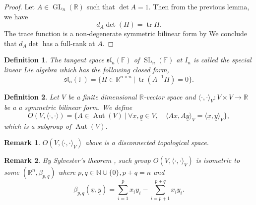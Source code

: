 \documentclass{article}
\newtheorem{definition}{Definition}[section]
\newtheorem{remark}{Remark}[section]
\numberwithin{equation}{section}
\DeclareMathOperator{\GL}{GL}
\DeclareMathOperator{\SL}{SL}
\DeclareMathOperator{\tr}{tr}
\DeclareMathOperator{\Aut}{Aut}
\begin{document}
\begin{proof}
Let $A\in\GL_n(\mathbb{R})$ such that $\det A =1$. Then from the previous lemma, we have
\begin{equation*}
d_A\det(H) = \tr H.
\end{equation*}
The trace function is a non-degenerate symmetric bilinear form by %
We conclude that $d_A\det$ has a full-rank at $A$.
\end{proof}

\begin{definition}
The tangent space $\mathfrak{sl}_n(\mathbb{F})$ of $\SL_n(\mathbb{F})$ at $I_n$ is called the special linear Lie algebra which has the following closed form,
\begin{equation*}
\mathfrak{sl}_n(\mathbb{F}) = \{H\in\mathbb{R}^{n\times n}\:|\: \tr(A^{-1}H) = 0\}.
\end{equation*}
\end{definition}

\begin{definition}
Let $V$ be a finite dimensional $\mathbb{R}$-vector space and $\langle\cdot,\cdot\rangle_V:V\times V\to\mathbb{R}$ be a a symmetric bilinear form. We define
\begin{equation*}
O(V,\langle\cdot,\cdot\rangle) = \{A\in\Aut(V)\:|\: \forall \underline{x},\underline{y}\in V,\quad \langle A\underline{x},A\underline{y}\rangle_V=\langle \underline{x},\underline{y}\rangle_V\},
\end{equation*} 
which is a subgroup of $\Aut(V)$.
\end{definition}

\begin{remark}
$O(V,\langle\cdot,\cdot\rangle_V)$ above is a disconnected topological space.
\end{remark}

\begin{remark}
By Sylvester's theorem%
, such group $O(V,\langle\cdot,\cdot\rangle_V)$ is isometric %
to some $(\mathbb{R}^n,\beta_{p,q})$ where $p,q\in\mathbb{N}\cup\{0\},p+q=n$ and 
\begin{equation*}
\beta_{p,q}(\underline{x},\underline{y}) = \sum_{i=1}^p x_iy_i-\sum_{i=p+1}^{p+q}x_iy_i.
\end{equation*}
\end{remark}
\end{document}
